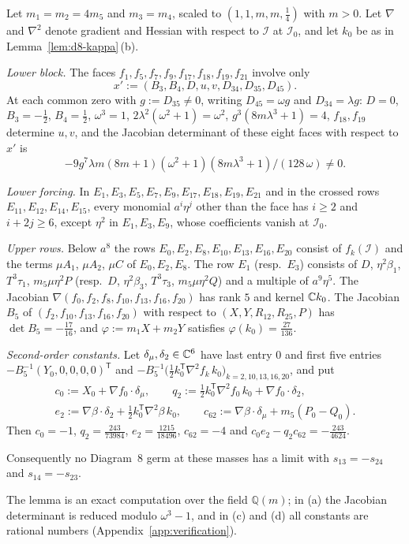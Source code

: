 \begin{lemma}\label{lem:d8-cancel}
Let $m_1=m_2=4m_5$ and $m_3=m_4$, scaled to $(1,1,m,m,\frac14)$ with $m>0$.  Let $\nabla$ and
$\nabla^2$ denote gradient and Hessian with respect to $\mathcal I$ at $\mathcal I_0$, and let
$k_0$ be as in Lemma~\ref{lem:d8-kappa}\,(b).
\begin{alphalist}
\item \emph{Lower block.}  The faces $f_1,f_5,f_7,f_9,f_{17},f_{18},f_{19},f_{21}$ involve only
\[
  x':=(B_3,B_4,D,u,v,D_{34},D_{35},D_{45}).
\]
At each common zero with $g:=D_{35}\ne0$, writing
$D_{45}=\omega g$ and $D_{34}=\lambda g$: $D=0$, $B_3=-\frac12$, $B_4=\frac12$, $\omega^3=1$,
$2\lambda^2(\omega^2+1)=\omega^2$, $g^3(8m\lambda^3+1)=4$, $f_{18},f_{19}$ determine $u,v$, and
the Jacobian determinant of these eight faces with respect to $x'$ is
\[
  -9g^7\lambda m(8m+1)(\omega^2+1)(8m\lambda^3+1)/(128\,\omega)\ne0.
\]
\item \emph{Lower forcing.}  In $E_1,E_3,E_5,E_7,E_9,E_{17},E_{18},E_{19},E_{21}$ and in the
crossed rows $E_{11},E_{12},E_{14},E_{15}$, every monomial $a^i\eta^j$ other than the face has
$i\ge2$ and $i+2j\ge6$, except $\eta^2$ in $E_1,E_3,E_9$, whose coefficients vanish at
$\mathcal I_0$.
\item \emph{Upper rows.}  Below $a^8$ the rows $E_0,E_2,E_8,E_{10},E_{13},E_{16},E_{20}$ consist
of $f_k(\mathcal I)$ and the terms $\mu A_1$, $\mu A_2$, $\mu C$ of $E_0,E_2,E_8$.  The row $E_1$
(resp.\ $E_3$) consists of $D$, $\eta^2\beta_1$, $T^3\tau_1$, $m_5\mu\eta^2P$ (resp.\ $D$,
$\eta^2\beta_3$, $T^3\tau_3$, $m_5\mu\eta^2Q$) and a multiple of $a^9\eta^5$.  The Jacobian
$\nabla(f_0,f_2,f_8,f_{10},f_{13},f_{16},f_{20})$ has rank $5$ and kernel $\mathbb{C} k_0$.  The Jacobian
$B_5$ of $(f_2,f_{10},f_{13},f_{16},f_{20})$ with respect to $(X,Y,R_{12},R_{25},P)$ has
$\det B_5=-\frac{17}{16}$, and $\varphi:=m_1X+m_2Y$ satisfies $\varphi(k_0)=\frac{27}{136}$.
\item \emph{Second-order constants.}  Let $\delta_\mu,\delta_2\in\mathbb{C}^6$ have last entry $0$ and
first five entries $-B_5^{-1}(Y_0,0,0,0,0)^{\mathsf T}$ and
$-B_5^{-1}\bigl(\frac12k_0^{\mathsf T}\nabla^2f_k\,k_0\bigr)_{k=2,10,13,16,20}$, and put
\begin{gather*}
  c_0:=X_0+\nabla f_0\cdot\delta_\mu,\qquad
  q_2:=\tfrac12k_0^{\mathsf T}\nabla^2f_0\,k_0+\nabla f_0\cdot\delta_2,\\
  e_2:=\nabla\beta\cdot\delta_2+\tfrac12k_0^{\mathsf T}\nabla^2\beta\,k_0,\qquad
  c_{62}:=\nabla\beta\cdot\delta_\mu+m_5(P_0-Q_0).
\end{gather*}
Then $c_0=-1$, $q_2=\frac{243}{73984}$, $e_2=\frac{1215}{18496}$, $c_{62}=-4$ and
$c_0e_2-q_2c_{62}=-\frac{243}{4624}$.
\end{alphalist}
Consequently no Diagram~8 germ at these masses has a limit with $s_{13}=-s_{24}$ and
$s_{14}=-s_{23}$.
\end{lemma}
The lemma is an exact computation over the field $\mathbb Q(m)$; in (a) the Jacobian determinant
is reduced modulo $\omega^3-1$, and in (c) and (d) all constants are rational numbers
(Appendix~\ref{app:verification}).

